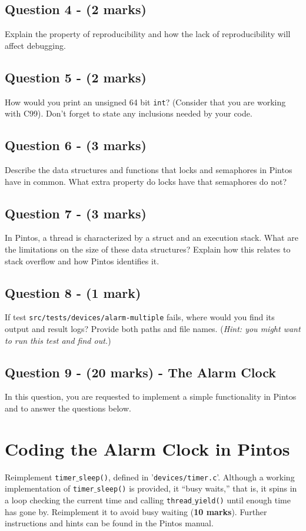 \documentclass[a4paper,12pt]{article}
\begin{document}
\subsection*{Question 4 - (2 marks)}
Explain the property of reproducibility and how the lack of reproducibility will affect debugging.

\subsection*{Question 5 - (2 marks)}
How would you print an unsigned 64 bit \texttt{int}? 
(Consider that you are working with C99). 
Don't forget to state any inclusions needed by your code.

\subsection*{Question 6 - (3 marks)}
Describe the data structures and functions that locks and semaphores in Pintos have in common. 
What extra property do locks have that semaphores do not?

\subsection*{Question 7 - (3 marks)}
In Pintos, a thread is characterized by a struct and an execution stack. 
What are the limitations on the size of these data structures? 
Explain how this relates to stack overflow and how Pintos identifies it.

\subsection*{Question 8 - (1 mark)}
If test \texttt{src/tests/devices/alarm-multiple} fails, where would you find its output and result logs? 
Provide both paths and file names.
(\textit{Hint: you might want to run this test and find out.}) 

\subsection*{Question 9 - (20 marks) - The Alarm Clock}
In this question, you are requested to implement a simple functionality in Pintos and to answer the questions below.

\section*{Coding the Alarm Clock in Pintos} 
Reimplement \texttt{timer$\_$sleep()}, defined in '\texttt{devices/timer.c}’. 
Although a working implementation of \texttt{timer$\_$sleep()} is provided, it “busy waits,” that is, it spins in a loop checking the current time and calling \texttt{thread$\_$yield()} until enough time has gone by. 
Reimplement it to avoid busy waiting ({\bf 10 marks}). 
Further instructions and hints can be found in the Pintos manual.
\end{document}

